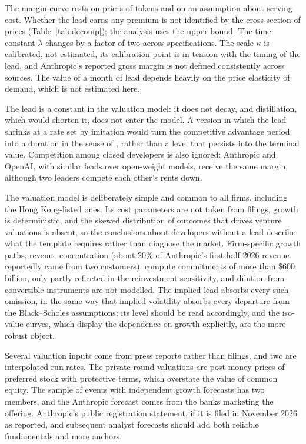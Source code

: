 \documentclass[12pt]{article}
\begin{document}
The margin curve rests on prices of tokens and on an assumption about serving cost. Whether the lead earns any premium is not identified by the cross-section of prices (Table~\ref{tab:decomp}); the analysis uses the upper bound. The time constant $\lambda$ changes by a factor of two across specifications. The scale $\kappa$ is calibrated, not estimated, its calibration point is in tension with the timing of the lead, and Anthropic's reported gross margin is not defined consistently across sources. The value of a month of lead depends heavily on the price elasticity of demand, which is not estimated here.

The lead is a constant in the valuation model: it does not decay, and distillation, which would shorten it, does not enter the model. A version in which the lead shrinks at a rate set by imitation would turn the competitive advantage period into a duration in the sense of \citet{mauboussin1997cap}, rather than a level that persists into the terminal value. Competition among closed developers is also ignored: Anthropic and OpenAI, with similar leads over open-weight models, receive the same margin, although two leaders compete each other's rents down.

The valuation model is deliberately simple and common to all firms, including the Hong Kong-listed ones. Its cost parameters are not taken from filings, growth is deterministic, and the skewed distribution of outcomes that drives venture valuations is absent, so the conclusions about developers without a lead describe what the template requires rather than diagnose the market. Firm-specific growth paths, revenue concentration (about 20\% of Anthropic's first-half 2026 revenue reportedly came from two customers), compute commitments of more than \$600 billion, only partly reflected in the reinvestment sensitivity, and dilution from convertible instruments are not modelled. The implied lead absorbs every such omission, in the same way that implied volatility absorbs every departure from the Black--Scholes assumptions; its level should be read accordingly, and the iso-value curves, which display the dependence on growth explicitly, are the more robust object.

Several valuation inputs come from press reports rather than filings, and two are interpolated run-rates. The private-round valuations are post-money prices of preferred stock with protective terms, which overstate the value of common equity. The sample of events with independent growth forecasts has two members, and the Anthropic forecast comes from the banks marketing the offering. Anthropic's public registration statement, if it is filed in November 2026 as reported, and subsequent analyst forecasts should add both reliable fundamentals and more anchors.
\end{document}
